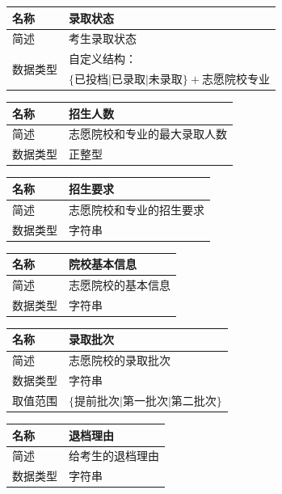\documentclass[CJK,utf8]{ctexrep}
\begin{document}
\begin{tabularx}{0.85\textwidth}{|l|X|}
	\hline
	名称 & 录取状态 \\
	\hline
	简述 & 考生录取状态 \\
	\hline
	\multirow{2}{*}{数据类型} & 自定义结构：\\
	& $\lbrace\text{已投档}\vert\text{已录取}\vert\text{未录取}
	\rbrace+\text{志愿院校专业}$ \\
	\hline
\end{tabularx}

\begin{tabularx}{0.85\textwidth}{|l|X|}
	\hline
	名称 & 招生人数 \\
	\hline
	简述 & 志愿院校和专业的最大录取人数 \\
	\hline
	数据类型 & 正整型 \\
	\hline
\end{tabularx}

\begin{tabularx}{0.85\textwidth}{|l|X|}
	\hline
	名称 & 招生要求 \\
	\hline
	简述 & 志愿院校和专业的招生要求 \\
	\hline
	数据类型 & 字符串 \\
	\hline
\end{tabularx}

\begin{tabularx}{0.85\textwidth}{|l|X|}
	\hline
	名称 & 院校基本信息 \\
	\hline
	简述 & 志愿院校的基本信息 \\
	\hline
	数据类型 & 字符串 \\
	\hline
\end{tabularx}

\begin{tabularx}{0.85\textwidth}{|l|X|}
	\hline
	名称 & 录取批次 \\
	\hline
	简述 & 志愿院校的录取批次\\
	\hline
	数据类型 & 字符串 \\
	\hline
	取值范围 & $\lbrace\text{提前批次}\vert\text{第一批次}\vert
	\text{第二批次}\rbrace$ \\
	\hline
\end{tabularx}

\begin{tabularx}{0.85\textwidth}{|l|X|}
	\hline
	名称 & 退档理由 \\
	\hline
	简述 & 给考生的退档理由 \\
	\hline
	数据类型 & 字符串 \\
	\hline
\end{tabularx}
\end{document}
